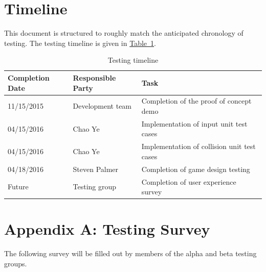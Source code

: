 \documentclass[12pt, titlepage]{article}
\begin{document}
\FloatBarrier 
\section{Timeline}
\label{sec:timeline}
This document is structured to roughly match the anticipated chronology of testing.  The testing timeline is given in \hyperref[tab:timeline]{Table~\ref*{tab:timeline}}.


\begin{table}[ht]
\caption{Testing timeline} \label{tab:timeline}
\begin{tabularx}{\textwidth}{p{2.5cm}p{3cm}X}
\toprule {\bf Completion Date} & {\bf Responsible Party} & {\bf Task}\\
\midrule
11/15/2015 & Development team & Completion of the proof of concept demo\\[0.3\baselineskip]
04/15/2016 & Chao Ye & Implementation of input unit test cases\\[0.3\baselineskip]
04/15/2016 & Chao Ye & Implementation of collision unit test cases\\[0.3\baselineskip]
04/18/2016 & Steven Palmer & Completion of game design testing\\[0.3\baselineskip]
Future & Testing group & Completion of user experience survey\\
\bottomrule
\end{tabularx}
\end{table}

\FloatBarrier
\newpage
\section{Appendix A:  Testing Survey}
\label{sec:survey}

The following survey will be filled out by members of the alpha and beta testing groups.
\end{document}

